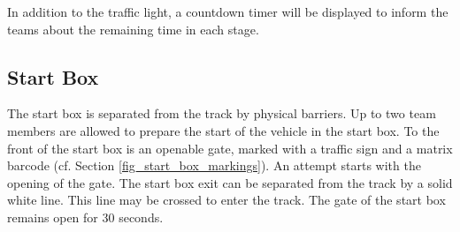 In addition to the traffic light, a countdown timer will be displayed to inform the teams about the remaining time in each stage.

\subsection{Start Box}
\label{start_box}

The start box is separated from the track by physical barriers.
Up to two team members are allowed to prepare the start of the vehicle in the start box.
To the front of the start box is an openable gate, marked with a traffic sign and a matrix barcode (cf. Section \ref{fig_start_box_markings}).
An attempt starts with the opening of the gate.
The start box exit can be separated from the track by a solid white line. This line may be crossed to enter the track.
The gate of the start box remains open for 30 seconds.
